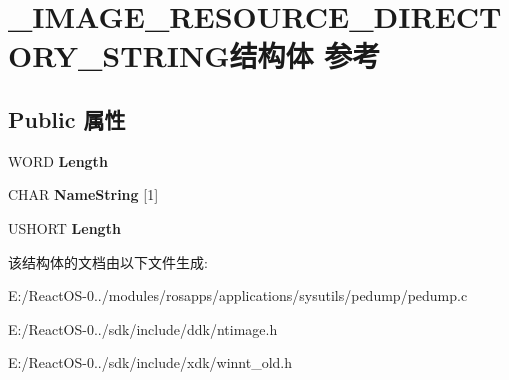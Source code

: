 \hypertarget{struct___i_m_a_g_e___r_e_s_o_u_r_c_e___d_i_r_e_c_t_o_r_y___s_t_r_i_n_g}{}\section{\+\_\+\+I\+M\+A\+G\+E\+\_\+\+R\+E\+S\+O\+U\+R\+C\+E\+\_\+\+D\+I\+R\+E\+C\+T\+O\+R\+Y\+\_\+\+S\+T\+R\+I\+N\+G结构体 参考}
\label{struct___i_m_a_g_e___r_e_s_o_u_r_c_e___d_i_r_e_c_t_o_r_y___s_t_r_i_n_g}
\subsection*{Public 属性}
\begin{DoxyCompactItemize}
\item 
\mbox{\label{struct___i_m_a_g_e___r_e_s_o_u_r_c_e___d_i_r_e_c_t_o_r_y___s_t_r_i_n_g_a3e51aee6994488fe6d7e5ea1fbf9db6a}} 
W\+O\+RD {\bfseries Length}
\item 
\mbox{\label{struct___i_m_a_g_e___r_e_s_o_u_r_c_e___d_i_r_e_c_t_o_r_y___s_t_r_i_n_g_a51aee300c3259c4d1e01560d48effe46}} 
C\+H\+AR {\bfseries Name\+String} \mbox{[}1\mbox{]}
\item 
\mbox{\label{struct___i_m_a_g_e___r_e_s_o_u_r_c_e___d_i_r_e_c_t_o_r_y___s_t_r_i_n_g_ab83d99d81bb60cdd4b0b3d31e1e29ba4}} 
U\+S\+H\+O\+RT {\bfseries Length}
\end{DoxyCompactItemize}


该结构体的文档由以下文件生成\+:\begin{DoxyCompactItemize}
\item 
E\+:/\+React\+O\+S-\/0../modules/rosapps/applications/sysutils/pedump/pedump.\+c\item 
E\+:/\+React\+O\+S-\/0../sdk/include/ddk/ntimage.\+h\item 
E\+:/\+React\+O\+S-\/0../sdk/include/xdk/winnt\+\_\+old.\+h\end{DoxyCompactItemize}
